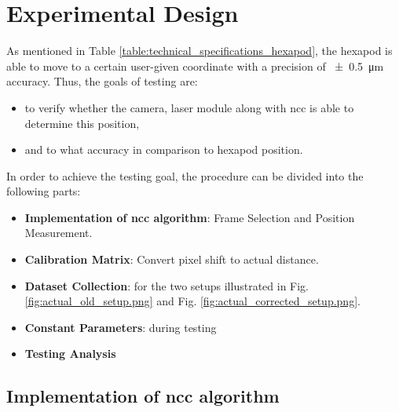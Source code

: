 \chapter{Experimental Design}

As mentioned in Table \ref{table:technical_specifications_hexapod}, the hexapod is able to move to a certain user-given coordinate with a precision of \SI{\pm0.5}{\micro\meter} accuracy. Thus, the goals of testing are:
\begin{itemize}
    \item to verify whether the camera, laser module along with \gls{ncc} is able to determine this position,
    \item and to what accuracy in comparison to hexapod position.     
\end{itemize}

\vspace{5mm}

\noindent In order to achieve the testing goal, the procedure can be divided into the following parts:

\begin{itemize}
    \item \textbf{Implementation of \gls{ncc} algorithm}: Frame Selection and Position Measurement.
    \item \textbf{Calibration Matrix}: Convert pixel shift to actual distance.
    \item \textbf{Dataset Collection}: for the two setups illustrated in Fig. \ref{fig:actual_old_setup.png} and Fig. \ref{fig:actual_corrected_setup.png}.
    \item \textbf{Constant Parameters}: during testing
    \item \textbf{Testing Analysis}
\end{itemize}


\section{Implementation of \gls{ncc} algorithm}\label{section:code_logic}
